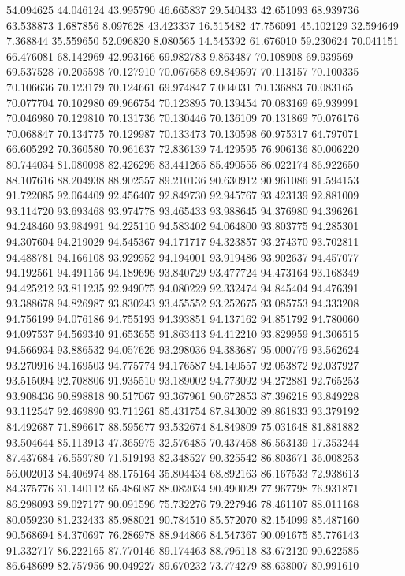 54.094625
44.046124
43.995790
46.665837
29.540433
42.651093
68.939736
63.538873
1.687856
8.097628
43.423337
16.515482
47.756091
45.102129
32.594649
7.368844
35.559650
52.096820
8.080565
14.545392
61.676010
59.230624
70.041151
66.476081
68.142969
42.993166
69.982783
9.863487
70.108908
69.939569
69.537528
70.205598
70.127910
70.067658
69.849597
70.113157
70.100335
70.106636
70.123179
70.124661
69.974847
7.004031
70.136883
70.083165
70.077704
70.102980
69.966754
70.123895
70.139454
70.083169
69.939991
70.046980
70.129810
70.131736
70.130446
70.136109
70.131869
70.076176
70.068847
70.134775
70.129987
70.133473
70.130598
60.975317
64.797071
66.605292
70.360580
70.961637
72.836139
74.429595
76.906136
80.006220
80.744034
81.080098
82.426295
83.441265
85.490555
86.022174
86.922650
88.107616
88.204938
88.902557
89.210136
90.630912
90.961086
91.594153
91.722085
92.064409
92.456407
92.849730
92.945767
93.423139
92.881009
93.114720
93.693468
93.974778
93.465433
93.988645
94.376980
94.396261
94.248460
93.984991
94.225110
94.583402
94.064800
93.803775
94.285301
94.307604
94.219029
94.545367
94.171717
94.323857
93.274370
93.702811
94.488781
94.166108
93.929952
94.194001
93.919486
93.902637
94.457077
94.192561
94.491156
94.189696
93.840729
93.477724
94.473164
93.168349
94.425212
93.811235
92.949075
94.080229
92.332474
94.845404
94.476391
93.388678
94.826987
93.830243
93.455552
93.252675
93.085753
94.333208
94.756199
94.076186
94.755193
94.393851
94.137162
94.851792
94.780060
94.097537
94.569340
91.653655
91.863413
94.412210
93.829959
94.306515
94.566934
93.886532
94.057626
93.298036
94.383687
95.000779
93.562624
93.270916
94.169503
94.775774
94.176587
94.140557
92.053872
92.037927
93.515094
92.708806
91.935510
93.189002
94.773092
94.272881
92.765253
93.908436
90.898818
90.517067
93.367961
90.672853
87.396218
93.849228
93.112547
92.469890
93.711261
85.431754
87.843002
89.861833
93.379192
84.492687
71.896617
88.595677
93.532674
84.849809
75.031648
81.881882
93.504644
85.113913
47.365975
32.576485
70.437468
86.563139
17.353244
87.437684
76.559780
71.519193
82.348527
90.325542
86.803671
36.008253
56.002013
84.406974
88.175164
35.804434
68.892163
86.167533
72.938613
84.375776
31.140112
65.486087
88.082034
90.490029
77.967798
76.931871
86.298093
89.027177
90.091596
75.732276
79.227946
78.461107
88.011168
80.059230
81.232433
85.988021
90.784510
85.572070
82.154099
85.487160
90.568694
84.370697
76.286978
88.944866
84.547367
90.091675
85.776143
91.332717
86.222165
87.770146
89.174463
88.796118
83.672120
90.622585
86.648699
82.757956
90.049227
89.670232
73.774279
88.638007
80.991610
